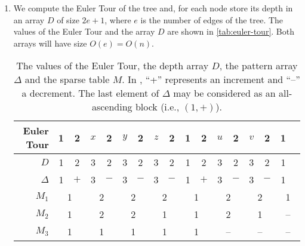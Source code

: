 \begin{enumerate}

  \item We compute the Euler Tour of the tree and, for each node store its depth
  in an array $D$ of size $2e + 1$, where $e$ is the number of edges of the
  tree. The values of the Euler Tour and the array $D$ are shown in
  \autoref{tab:euler-tour}. Both arrays will have size $O(e) = O(n)$.
  \begin{table}[t]
    \centering
    \begin{tabular}{|r||c|c|c|c|c|c|c|c|c|c|c|c|c|c|c|c|}
      \hline
      Euler Tour & 1 & 2 & $x$ & 2 & $y$ & 2 & $z$ & 2 & 1 & 2 & $u$ & 2 & $v$ & 2 & 1 \\\hline
             $D$ & 1 & 2 & 3 & 2 & 3 & 2 & 3 & 2 & 1 & 2 & 3 & 2 & 3 & 2 & 1 \\\hline\hline
        $\Delta$ & \multicolumn{1}{c}{1} & \multicolumn{1}{c|}{$+$} &
                   \multicolumn{1}{c}{3} & \multicolumn{1}{c|}{$-$} &
                   \multicolumn{1}{c}{3} & \multicolumn{1}{c|}{$-$} &
                   \multicolumn{1}{c}{3} & \multicolumn{1}{c|}{$-$} &
                   \multicolumn{1}{c}{1} & \multicolumn{1}{c|}{$+$} &
                   \multicolumn{1}{c}{3} & \multicolumn{1}{c|}{$-$} &
                   \multicolumn{1}{c}{3} & \multicolumn{1}{c|}{$-$} &
                   \multicolumn{1}{c|}{1} \\\hline
           $M_1$ & \multicolumn{2}{c|}{1} & \multicolumn{2}{c|}{2} &
                   \multicolumn{2}{c|}{2} & \multicolumn{2}{c|}{2} &
                   \multicolumn{2}{c|}{1} & \multicolumn{2}{c|}{2} &
                   \multicolumn{2}{c|}{2} & \multicolumn{2}{c|}{1} \\
           $M_2$ & \multicolumn{2}{c|}{1} & \multicolumn{2}{c|}{2} &
                   \multicolumn{2}{c|}{2} & \multicolumn{2}{c|}{1} &
                   \multicolumn{2}{c|}{1} & \multicolumn{2}{c|}{2} &
                   \multicolumn{2}{c|}{1} & \multicolumn{2}{c|}{--} \\
           $M_3$ & \multicolumn{2}{c|}{1} & \multicolumn{2}{c|}{1} &
                   \multicolumn{2}{c|}{1} & \multicolumn{2}{c|}{1} &
                   \multicolumn{2}{c|}{1} & \multicolumn{2}{c|}{--} &
                   \multicolumn{2}{c|}{--} & \multicolumn{2}{c|}{--} \\\hline
    \end{tabular}

    \caption{The values of the Euler Tour, the depth array $D$, the pattern
    array $\Delta$ and the sparse table $M$. In \Delta, ``+'' represents an
    increment and ``--'' a decrement. The last element of $\Delta$ may be
    considered as an all-ascending block (i.e., $(1, +)$).}


\end{table}
\end{enumerate}
